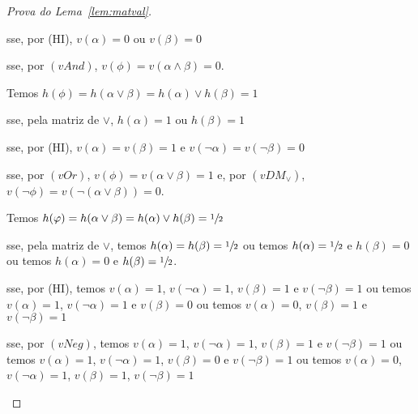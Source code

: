 \begin{proof}[Prova do Lema~\ref{lem:matval}]
\begin{provaporcasos}
\begin{provaporsubcasos}
                    \qquad{}sse, por (HI), $v(\alpha) = 0$ ou $v(\beta) = 0$

                    \qquad{}sse, por $(vAnd)$, $v(\phi) = v(\alpha \land \beta) = 0$.

            \end{provaporsubcasos}


            \begin{provaporsubcasos}

                    Temos $h(\phi) = h(\alpha \lor \beta) = h(\alpha) \lor h(\beta) = 1$

                    \qquad{}sse, pela matriz de $\lor$, $h(\alpha) = 1$ ou $h(\beta) = 1$

                    \qquad{}sse, por (HI), $v(\alpha) = v(\beta) = 1$ e $v(\neg \alpha) = v(\neg \beta) = 0$

                    \qquad{}sse, por $(vOr)$, $v(\phi) = v(\alpha \lor \beta) = 1$ e, por $(vDM_{\lor})$, $v(\neg \phi) = v(\neg(\alpha \lor \beta)) = 0$.


                    Temos $h(\varphi) = h(\alpha \lor \beta) = h(\alpha) \lor h(\beta) = \sfrac{1}{2}{}$

                    \qquad{}sse, pela matriz de $\lor$, temos $h(\alpha) = h(\beta) = \sfrac{1}{2}{}$ ou temos $h(\alpha) = \sfrac{1}{2}{}$ e $h(\beta) = 0$ ou temos $h(\alpha) = 0$ e $h(\beta) = \sfrac{1}{2}{}$.

                    \qquad{}sse, por (HI), temos $v(\alpha) = 1$, $v(\neg \alpha) = 1$, $v(\beta) = 1$ e $v(\neg \beta) = 1$ ou temos $v(\alpha) = 1$, $v(\neg \alpha) = 1$ e $v(\beta) = 0$ ou temos $v(\alpha) = 0$, $v(\beta) = 1$ e $v(\neg \beta) = 1$

                    \qquad{}sse, por $(vNeg)$, temos $v(\alpha) = 1$, $v(\neg \alpha) = 1$, $v(\beta) = 1$ e $v(\neg \beta) = 1$ ou temos $v(\alpha) = 1$, $v(\neg \alpha) = 1$, $v(\beta) = 0$ e $v(\neg \beta) = 1$ ou temos $v(\alpha) = 0$, $v(\neg \alpha) = 1$, $v(\beta) = 1$, $v(\neg \beta) = 1$


\end{provaporsubcasos}
\end{provaporcasos}
\end{proof}
